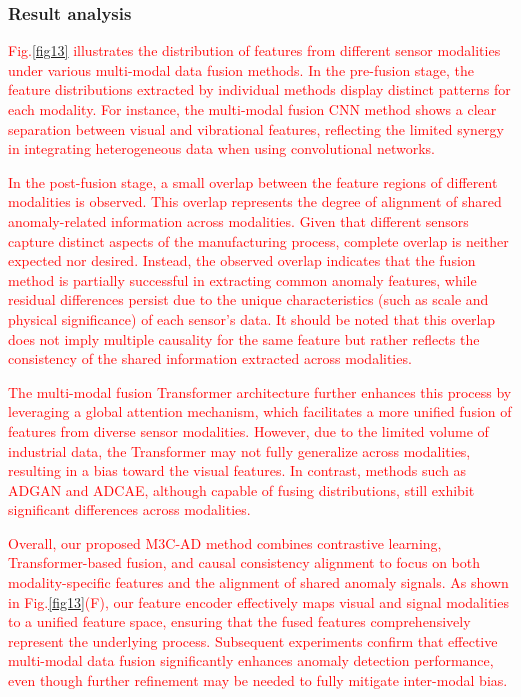 \documentclass[preprint,12pt]{elsarticle}
\begin{document}
\subsubsection{Result analysis}
\textcolor{red}{Fig.\ref{fig13} illustrates the distribution of features from different sensor modalities under various multi-modal data fusion methods. In the pre-fusion stage, the feature distributions extracted by individual methods display distinct patterns for each modality. For instance, the multi-modal fusion CNN method shows a clear separation between visual and vibrational features, reflecting the limited synergy in integrating heterogeneous data when using convolutional networks.}

\textcolor{red}{In the post-fusion stage, a small overlap between the feature regions of different modalities is observed. This overlap represents the degree of alignment of shared anomaly-related information across modalities. Given that different sensors capture distinct aspects of the manufacturing process, complete overlap is neither expected nor desired. Instead, the observed overlap indicates that the fusion method is partially successful in extracting common anomaly features, while residual differences persist due to the unique characteristics (such as scale and physical significance) of each sensor's data. It should be noted that this overlap does not imply multiple causality for the same feature but rather reflects the consistency of the shared information extracted across modalities.}

\textcolor{red}{The multi-modal fusion Transformer architecture further enhances this process by leveraging a global attention mechanism, which facilitates a more unified fusion of features from diverse sensor modalities. However, due to the limited volume of industrial data, the Transformer may not fully generalize across modalities, resulting in a bias toward the visual features. In contrast, methods such as ADGAN and ADCAE, although capable of fusing distributions, still exhibit significant differences across modalities.}

\textcolor{red}{Overall, our proposed M3C-AD method combines contrastive learning, Transformer-based fusion, and causal consistency alignment to focus on both modality-specific features and the alignment of shared anomaly signals. As shown in Fig.\ref{fig13}(F), our feature encoder effectively maps visual and signal modalities to a unified feature space, ensuring that the fused features comprehensively represent the underlying process. Subsequent experiments confirm that effective multi-modal data fusion significantly enhances anomaly detection performance, even though further refinement may be needed to fully mitigate inter-modal bias.}
\end{document}
